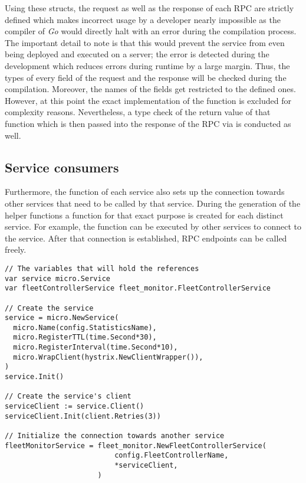 \documentclass[12pt,a4paper,twoside]{report}
\begin{document}
Using these structs, the request as well as the response of each RPC
are strictly defined which makes incorrect usage by a developer nearly impossible
as the compiler of \textit{Go} would directly halt with an error during the
compilation process.
The important detail to note is that this would prevent the service from
even being deployed and executed on a server; the error is detected during
the development which reduces errors during runtime by a large margin.
Thus, the types of every field of the request and the response will be checked
during the compilation. Moreover, the names of the fields get restricted
to the defined ones.
However, at this point the exact implementation of the function
 is excluded for complexity reasons.
Nevertheless, a type check of the return value of that function which is then
passed into the response of the RPC via  is conducted as well.

\subsection{Service consumers}

Furthermore, the  function of each service also sets up
the connection towards other services that need to be called by that service.
During the generation of the helper functions a function for that exact purpose
is created for each distinct service.
For example, the function  can be executed by
other services to connect to the  service. After that
connection is established, RPC endpoints can be called freely.

\begin{lstlisting}[title=services/statistics/main.go]
// The variables that will hold the references
var service micro.Service
var fleetControllerService fleet_monitor.FleetControllerService

// Create the service
service = micro.NewService(
  micro.Name(config.StatisticsName),
  micro.RegisterTTL(time.Second*30),
  micro.RegisterInterval(time.Second*10),
  micro.WrapClient(hystrix.NewClientWrapper()),
)
service.Init()

// Create the service's client
serviceClient := service.Client()
serviceClient.Init(client.Retries(3))

// Initialize the connection towards another service
fleetMonitorService = fleet_monitor.NewFleetControllerService(
                          config.FleetControllerName,
                          *serviceClient,
                      )
\end{lstlisting}
\end{document}
